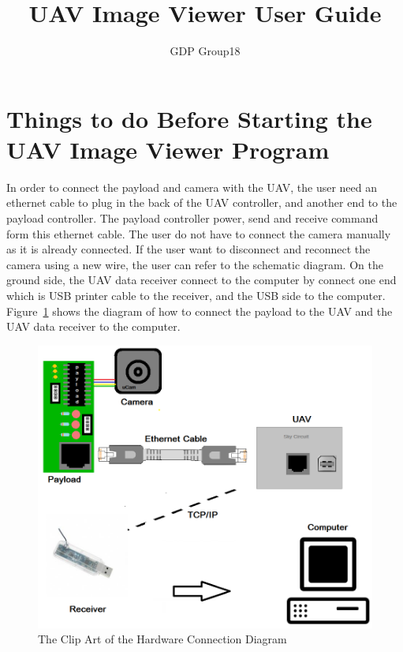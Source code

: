 \documentclass[a4paper,11pt]{article}
\author{GDP Group18}
\title{UAV Image Viewer User Guide}
\begin{document}
\maketitle
\section{Things to do Before Starting the UAV Image Viewer Program}
In order to connect the payload and camera with the UAV,
the user need an ethernet cable to plug in the back of the UAV controller,
and another end to the payload controller.
The payload controller power, send and receive command form this ethernet cable.
The user do not have to connect the camera manually as it is already connected.
If the user want to disconnect and reconnect the camera using a new wire, 
the user can refer to the schematic diagram.
On the ground side, the UAV data receiver connect to the computer by connect one end which is USB printer cable to the receiver, and the USB side to the computer.
Figure~\ref{clipArt} shows the diagram of how to connect the payload to the UAV and the UAV data receiver to the computer. 

\begin{figure}[!htbp]
\begin{center}
\includegraphics[scale=0.4]{clipArt.png} 
\caption{The Clip Art of the Hardware Connection Diagram\label{clipArt}}
\end{center}
\end{figure}
\end{document}

